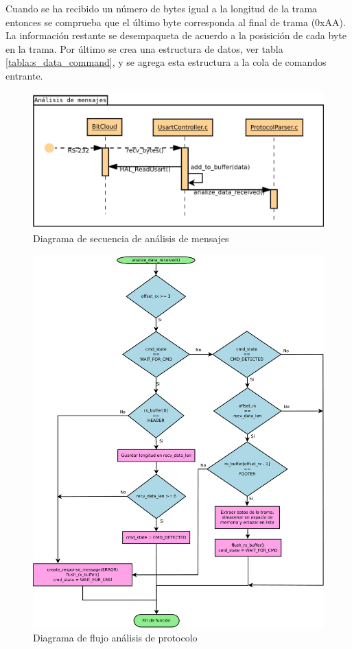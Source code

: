 Cuando se ha recibido un número de bytes igual a la longitud de la trama entonces se comprueba que el último byte corresponda al final de trama (0xAA). La información restante se desempaqueta de acuerdo a la posisición de cada byte en la trama. Por último se crea una estructura de datos, ver tabla \ref{tabla:s_data_command}, y se agrega esta estructura a la cola de comandos entrante. 

\begin{figure}
	\centering
	\includegraphics[scale=0.45]{capitulo_3_imgs/analisis_mensajes_secuencia.pdf}
	\caption{Diagrama de secuencia de análisis de mensajes}
	\label{fig:diagrama_secuencia_analisis}
\end{figure}

\begin{figure}
	\centering
	\includegraphics[scale=0.25]{capitulo_3_imgs/analisis_mensaje_flujo_parser.pdf}
	\caption{Diagrama de flujo análisis de protocolo}
	\label{fig:diagrama_flujo_parser}
\end{figure}

